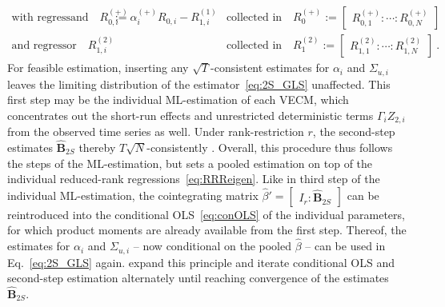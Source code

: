 \begin{align}
	\text{with regressand} \quad R^{(+)}_{0,i} & := \alpha_{i}^{(+)} R^{\ }_{0,i} - R_{1,i}^{(1)} & \text{collected in} \quad R_0^{(+)} := \begin{bmatrix} R^{(+)}_{0,1} : \cdots : R^{(+)}_{0,N} \end{bmatrix} & \nonumber \\
	\text{and regressor} \quad R_{1,i}^{(2)} &  & \text{collected in} \quad R_1^{(2)} := \begin{bmatrix} R_{1,1}^{(2)} : \cdots : R_{1,N}^{(2)} \end{bmatrix} &. \nonumber
\end{align}
For feasible estimation, inserting any $ \sqrt{T} $-consistent estimates for $ \alpha_i $ and $ \Sigma_{u,i} $ leaves the limiting distribution of the estimator~\eqref{eq:2S_GLS} unaffected. This first step may be the individual ML-estimation of each VECM, which concentrates out the short-run effects and unrestricted deterministic terms $ \Gamma_i Z_{2,i} $ from the observed time series as well. Under rank-restriction $ r $, the second-step estimates $ \widehat{\mathbf{B}}_{2S}$ thereby $ T\sqrt{N} $-consistently \citep[p.~156, Th.~1]{Breitung2005}. Overall, this procedure thus follows the steps of the ML-estimation, but sets a pooled estimation on top of the individual reduced-rank regressions~\eqref{eq:RRReigen}. Like in third step of the individual ML-estimation, the cointegrating matrix $ \widehat{\beta}' = \begin{bmatrix} I_r : \widehat{\mathbf{B}}_{2S} \end{bmatrix} $ can be reintroduced into the conditional OLS~\eqref{eq:conOLS} of the individual parameters, for which product moments are already available from the first step. Thereof, the estimates for $ \alpha_i $ and $ \Sigma_{u,i} $ -- now conditional on the pooled $ \widehat{\beta} $ -- can be used in Eq.~\eqref{eq:2S_GLS} again. \citet[p.~195]{HlouskovaWagner2010} expand this principle and iterate conditional OLS and second-step estimation alternately until reaching convergence of the estimates $ \widehat{\mathbf{B}}_{2S} $.


